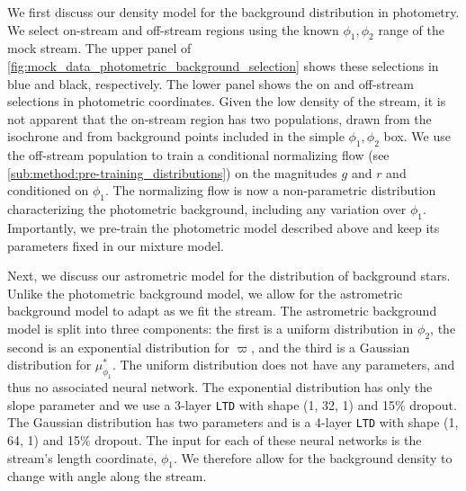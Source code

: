 \documentclass[twocolumn, linenumbers]{aastex631}
\newcommand{\parallax}{\varpi}
\begin{document}
        We first discuss our density model for the background distribution in photometry. We select on-stream and off-stream regions using the known $\phi_1,
        \phi_2$ range of the mock stream.  The upper panel of
        \autoref{fig:mock_data_photometric_background_selection} shows these
        selections in blue and black, respectively.  The lower panel shows the
        on and off-stream selections in photometric coordinates. Given the low density of the stream, it is not apparent that the on-stream region has two populations, drawn from
        the isochrone and from background points included in the simple $\phi_1,
        \phi_2$ box. We use the off-stream population to train a
        conditional normalizing flow (see
        \autoref{sub:method:pre-training_distributions}) on the magnitudes $g$
        and $r$ and conditioned on $\phi_1$.  The normalizing flow is now a
        non-parametric distribution characterizing the photometric background,
        including any variation over $\phi_1$. Importantly, we pre-train the photometric model described above and keep its parameters fixed in our mixture model.

       
        Next, we discuss our astrometric model for the distribution of background stars. Unlike the photometric background model, we allow for the astrometric background model to adapt as we fit the stream. The astrometric background model is split into three components: the first is a uniform
        distribution in $\phi_2$, the second is an exponential distribution
        for $\parallax$, and the third is a Gaussian distribution for $\mu_{\phi_1}^*$.  The uniform distribution does not have any parameters,
        and thus no associated neural network.  The exponential distribution has only the
        slope parameter and we use a 3-layer \texttt{LTD} with shape (1, 32, 1)
        and 15\% dropout. The Gaussian distribution has two parameters and is a 4-layer \texttt{LTD} with shape (1, 64, 1)
        and 15\% dropout. The input for each of these neural networks is the stream's length coordinate, $\phi_1$. We therefore allow for the background density to change with angle along the stream.
        
    
\end{document}
